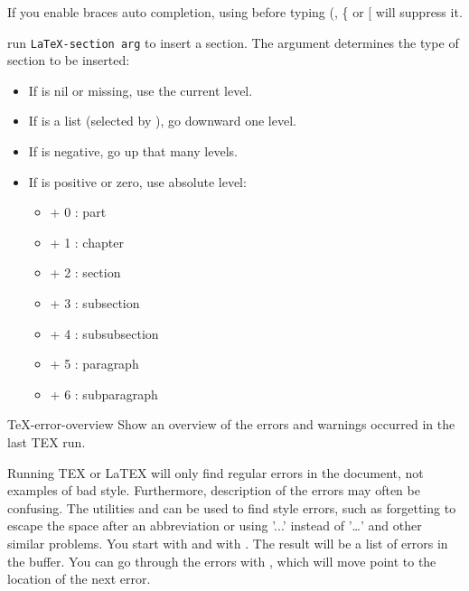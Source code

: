 If you enable braces auto completion, using  before typing (, \{ or [ will suppress it.


 run \lstinline[language=TeX]|LaTeX-section arg| to insert a section.
The argument  determines the type of section to be inserted:
\begin{itemize}
\item If  is nil or missing, use the current level.
\item If  is a list (selected by ), go downward one level.
\item If  is negative, go up that many levels.
\item If  is positive or zero, use absolute level:
  \begin{itemize}[label=$\maltese$]
  \item + 0 : part
  \item + 1 : chapter
  \item + 2 : section
  \item + 3 : subsection
  \item + 4 : subsubsection
  \item + 5 : paragraph
  \item + 6 : subparagraph
  \end{itemize}
\end{itemize}


TeX-error-overview Show an overview of the errors and warnings occurred in the last TEX run.


Running TEX or LaTEX will only find regular errors in the document, not examples of bad style.
Furthermore, description of the errors may often be confusing.
The utilities  and  can be used to find style errors, such as forgetting to escape the space after an abbreviation or using '...' instead of '\ldots' and other similar problems.
You start  with  and  with .
The result will be a list of errors in the  buffer.
You can go through the errors with , which will move point to the location of the next error.





